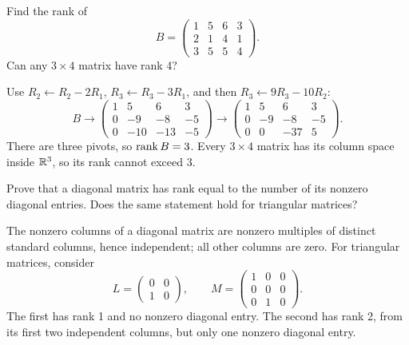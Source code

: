 \begin{problem}\label{ex:03:rectangular-rank}
Find the rank of
\[
B=\begin{pmatrix}1&5&6&3\\2&1&4&1\\3&5&5&4\end{pmatrix}.
\]
Can any \(3\times4\) matrix have rank 4?
\end{problem}
\begin{solution}
Use \(R_2\leftarrow R_2-2R_1\), \(R_3\leftarrow R_3-3R_1\),
and then \(R_3\leftarrow9R_3-10R_2\):
\[
B\longrightarrow
\begin{pmatrix}1&5&6&3\\0&-9&-8&-5\\0&-10&-13&-5\end{pmatrix}
\longrightarrow
\begin{pmatrix}1&5&6&3\\0&-9&-8&-5\\0&0&-37&5\end{pmatrix}.
\]
There are three pivots, so \(\operatorname{rank} B=3\).
Every \(3\times4\) matrix has its column space inside \(\mathbb R^3\),
so its rank cannot exceed 3.
\end{solution}

\begin{problem}\label{ex:03:diagonal-rank}
Prove that a diagonal matrix has rank equal to the number of its nonzero
diagonal entries. Does the same statement hold for triangular matrices?
\end{problem}
\begin{solution}
The nonzero columns of a diagonal matrix are nonzero multiples of distinct
standard columns, hence independent; all other columns are zero.
For triangular matrices, consider
\[
L=\begin{pmatrix}0&0\\1&0\end{pmatrix},\qquad
M=\begin{pmatrix}1&0&0\\0&0&0\\0&1&0\end{pmatrix}.
\]
The first has rank 1 and no nonzero diagonal entry. The second has rank 2,
from its first two independent columns, but only one nonzero diagonal entry.
\end{solution}

